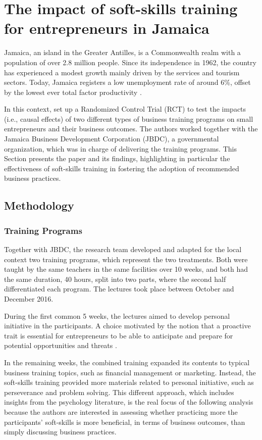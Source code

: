 \chapter{The impact of soft-skills training for entrepreneurs in Jamaica }
\label{sec-2-summary}

Jamaica, an island in the Greater Antilles, is a Commonwealth realm with a population of over 2.8 million people. Since its independence in 1962, the country has experienced a modest growth mainly driven by the services and tourism sectors. Today, Jamaica registers a low unemployment rate of around 6\%, offset by the lowest ever total factor productivity \parencite{WorldBank}.

In this context, \cite{Ubfal2022} set up a Randomized Control Trial (RCT) to test the impacts (i.e., causal effects) of two different types of business training programs on small entrepreneurs and their business outcomes. The authors worked together with the Jamaica Business Development Corporation (JBDC), a governmental organization, which was in charge of delivering the training programs. This Section presents the paper and its findings, highlighting in particular the effectiveness of soft-skills training in fostering the adoption of recommended business practices.



\section{Methodology}

\subsection{Training Programs}

Together with JBDC, the research team developed and adapted for the local context two training programs, which represent the two treatments. Both were taught by the same teachers in the same facilities over 10 weeks, and both had the same duration, 40 hours, split into two parts, where the second half differentiated each program. The lectures took place between October and December 2016.

During the first common 5 weeks, the lectures aimed to develop personal initiative in the participants. A choice motivated by the notion that a proactive trait is essential for entrepreneurs to be able to anticipate and prepare for potential opportunities and threats \parencite{Frese2014}.

In the remaining weeks, the combined training expanded its contents to typical business training topics, such as financial management or marketing. Instead, the soft-skills training provided more materials related to personal initiative, such as perseverance and problem solving. This different approach, which includes insights from the psychology literature, is the real focus of the following analysis because the authors are interested in assessing whether practicing more the participants' soft-skills is more beneficial, in terms of business outcomes, than simply discussing business practices.

